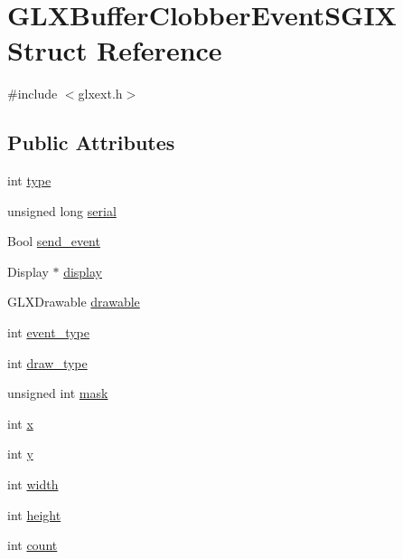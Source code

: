 \hypertarget{struct_g_l_x_buffer_clobber_event_s_g_i_x}{
\section{GLXBufferClobberEventSGIX Struct Reference}
\label{struct_g_l_x_buffer_clobber_event_s_g_i_x}
}


{\ttfamily \#include $<$glxext.h$>$}

\subsection*{Public Attributes}
\begin{DoxyCompactItemize}
\item 
int \hyperlink{struct_g_l_x_buffer_clobber_event_s_g_i_x_a36e3e8a5feea664623ea43d0f273b63a}{type}
\item 
unsigned long \hyperlink{struct_g_l_x_buffer_clobber_event_s_g_i_x_ac295e3276a7986eeae4d6a2a28c7e0b7}{serial}
\item 
Bool \hyperlink{struct_g_l_x_buffer_clobber_event_s_g_i_x_af43bf0edbe40a74ef58dfb546a75118b}{send\_\-event}
\item 
Display $\ast$ \hyperlink{struct_g_l_x_buffer_clobber_event_s_g_i_x_afef060d81026da75c846727f4a3de9d4}{display}
\item 
GLXDrawable \hyperlink{struct_g_l_x_buffer_clobber_event_s_g_i_x_a9c45674193ed80a79261c3b7518ee04f}{drawable}
\item 
int \hyperlink{struct_g_l_x_buffer_clobber_event_s_g_i_x_a0b405123f1d6528f1f4dfa7ff92bde9b}{event\_\-type}
\item 
int \hyperlink{struct_g_l_x_buffer_clobber_event_s_g_i_x_a25c31e8cbec0919f74a1e93ae74175b1}{draw\_\-type}
\item 
unsigned int \hyperlink{struct_g_l_x_buffer_clobber_event_s_g_i_x_a74b4ad1ad3cac011001151411f621da1}{mask}
\item 
int \hyperlink{struct_g_l_x_buffer_clobber_event_s_g_i_x_a5118d48c3c8d5253d39922b5014b52ff}{x}
\item 
int \hyperlink{struct_g_l_x_buffer_clobber_event_s_g_i_x_aef21efa11558a5b67861f96471c56003}{y}
\item 
int \hyperlink{struct_g_l_x_buffer_clobber_event_s_g_i_x_adad23535733161528427584a42bfc6eb}{width}
\item 
int \hyperlink{struct_g_l_x_buffer_clobber_event_s_g_i_x_a7838dbabb76c22aa8241310a3f2363ea}{height}
\item 
int \hyperlink{struct_g_l_x_buffer_clobber_event_s_g_i_x_ad8f4f0aae058e0a1ff542679823e37a9}{count}
\end{DoxyCompactItemize}


